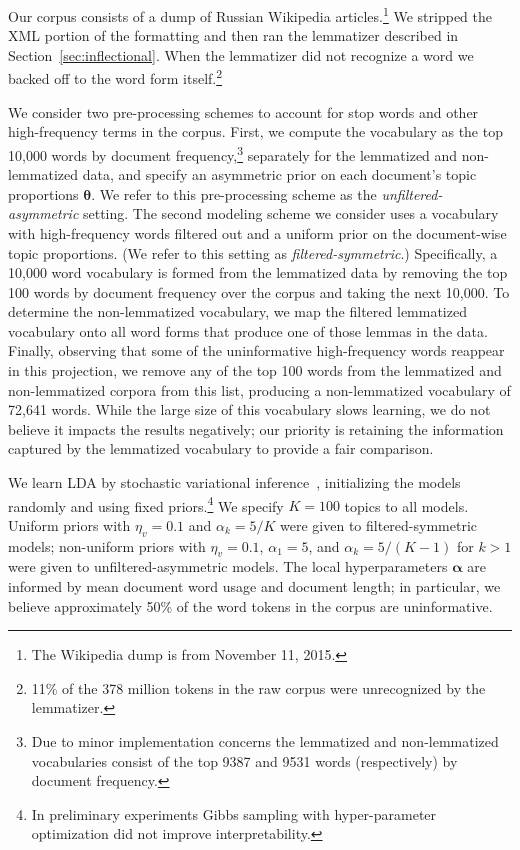 \documentclass[11pt,letterpaper]{article}
\renewcommand{\vec}{\boldsymbol}   %
\newcommand{\valpha}{{\vec{\alpha}}}
\newcommand{\vtheta}{{\vec{\theta}}}
\begin{document}
{Our corpus consists of a dump of Russian Wikipedia articles.\footnote{
    The Wikipedia dump is from November 11, 2015.
}
We stripped the XML portion of the formatting and then ran the
lemmatizer described in Section~\ref{sec:inflectional}.  When the
lemmatizer did not recognize a word we backed off to the word form
itself.\footnote{
    11\% of the 378 million tokens in the raw corpus were
    unrecognized by the lemmatizer.
}

We consider two pre-processing schemes to account for stop words and
other high-frequency terms in the corpus.  First, we compute the
vocabulary as the top 10,000 words by document frequency,\footnote{
    Due to minor implementation concerns the lemmatized and
    non-lemmatized vocabularies consist of the top 9387 and 9531 words
    (respectively) by document frequency.
}
separately for the lemmatized and non-lemmatized data, and
specify an asymmetric prior on each document's topic proportions
$\vtheta$.
We refer to this pre-processing scheme
as the \emph{unfiltered-asymmetric} setting.  The second modeling scheme we
consider uses a vocabulary with high-frequency words filtered out and a
uniform prior on the document-wise topic proportions.
(We refer to this setting as \emph{filtered-symmetric}.)
Specifically, a 10,000 word vocabulary is formed from the
lemmatized data by removing the top 100 words by document frequency
over the corpus and taking the next 10,000.  To determine the
non-lemmatized vocabulary, we map the filtered lemmatized
vocabulary onto all word forms that produce one of those lemmas in
the data.  Finally, observing that some of the uninformative
high-frequency words reappear in this projection, we remove any
of the top 100 words from the lemmatized and non-lemmatized corpora
from this list, producing a non-lemmatized vocabulary of 72,641 words.
While the large size of this vocabulary slows learning,
we do not believe it impacts the results negatively;
our priority is retaining the information captured by the lemmatized
vocabulary to provide a fair comparison.

We learn LDA by stochastic variational
inference~\cite{hoffman2013}, initializing the models randomly and
using fixed priors.\footnote{
    In preliminary experiments Gibbs
    sampling with hyper-parameter optimization did not improve
    interpretability.
}
We specify $K = 100$ topics to all models.
Uniform priors with $\eta_v = 0.1$ and
$\alpha_k = 5 / K$ were given to
filtered-symmetric models; non-uniform priors with
$\eta_v = 0.1$, $\alpha_1 = 5$, and $\alpha_k = 5 / (K-1)$
for $k > 1$
were given to unfiltered-asymmetric models.
The local hyperparameters $\valpha$ are informed by mean
document word usage and document length; in particular, we
believe approximately 50\% of the word tokens in the corpus are
uninformative.

}
\end{document}
